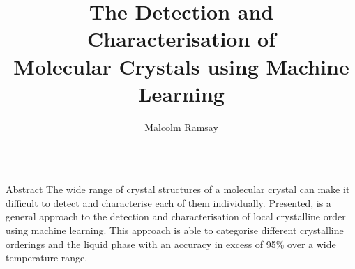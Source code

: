 \documentclass{beamer}
\title{The Detection and Characterisation of \\\vspace{0.3em} Molecular Crystals using Machine Learning}
\author{Malcolm Ramsay}
\institute{School of Chemistry, The University of Sydney}
\begin{document}
\begin{frame}[t]{}
  \begin{columns}[t]

    \begin{column}{0.47\linewidth}

      \begin{block}{Abstract}
        The wide range of crystal structures of a molecular crystal
        can make it difficult to detect and characterise each of them individually.
        Presented, is a general approach to the detection and characterisation
        of local crystalline order using machine learning.
        This approach is able to categorise different crystalline orderings and the liquid phase
        with an accuracy in excess of 95\% over a wide temperature range.
      \end{block}


\end{column}
\end{columns}
\end{frame}
\end{document}
